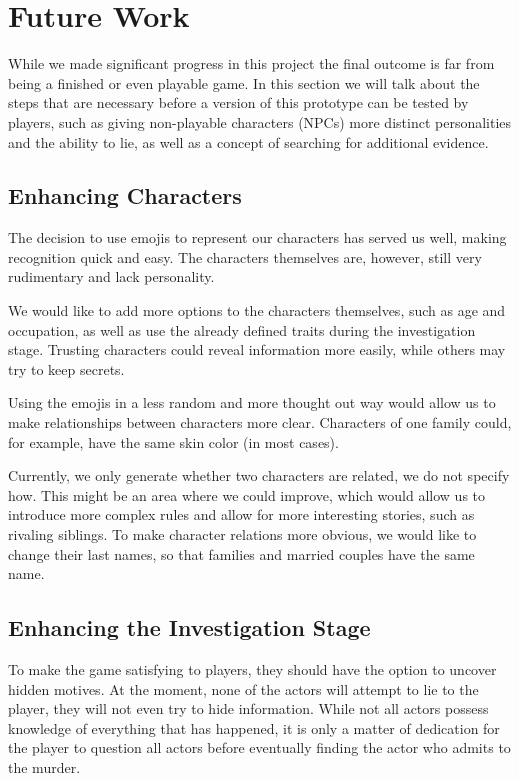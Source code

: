 \section{Future Work} \label{future_work}

While we made significant progress in this project the final outcome is far from being a finished or even playable game.
In this section we will talk about the steps that are necessary before a version of this prototype can be tested by players, such as giving non-playable characters (NPCs) more distinct personalities and the ability to lie, as well as a concept of searching for additional evidence.

\subsection{Enhancing Characters}

The decision to use emojis to represent our characters has served us well, making recognition quick and easy.
The characters themselves are, however, still very rudimentary and lack personality.

We would like to add more options to the characters themselves, such as age and occupation, as well as use the already defined traits during the investigation stage. Trusting characters could reveal information more easily, while others may try to keep secrets.

Using the emojis in a less random and more thought out way would allow us to make relationships between characters more clear. Characters of one family could, for example, have the same skin color (in most cases).

Currently, we only generate whether two characters are related, we do not specify how.
This might be an area where we could improve, which would allow us to introduce more complex rules and allow for more interesting stories, such as rivaling siblings. To make character relations more obvious, we would like to change their last names, so that families and married couples have the same name.

\subsection{Enhancing the Investigation Stage}
To make the game satisfying to players, they should have the option to uncover hidden motives.
At the moment, none of the actors will attempt to lie to the player, they will not even try to hide information.
While not all actors possess knowledge of everything that has happened, it is only a matter of dedication for the player to question all actors before eventually finding the actor who admits to the murder.

